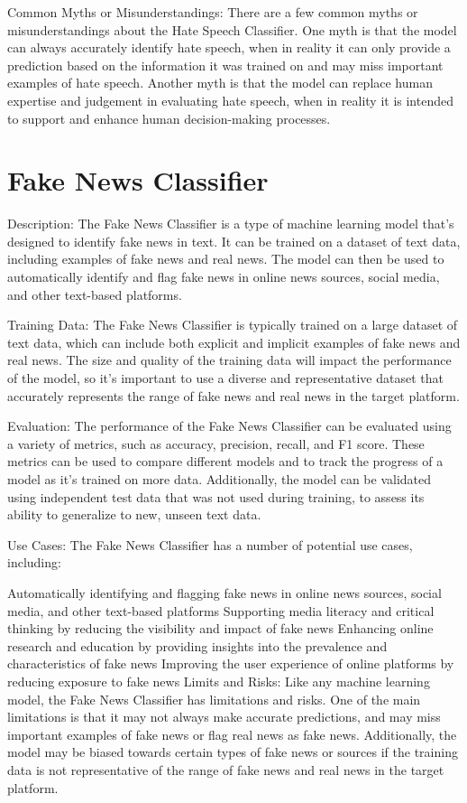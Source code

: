 Common Myths or Misunderstandings:
There are a few common myths or misunderstandings about the Hate Speech Classifier. One myth is that the model can always accurately identify hate speech, when in reality it can only provide a prediction based on the information it was trained on and may miss important examples of hate speech. Another myth is that the model can replace human expertise and judgement in evaluating hate speech, when in reality it is intended to support and enhance human decision-making processes.

\section{Fake News Classifier}

Description:
The Fake News Classifier is a type of machine learning model that's designed to identify fake news in text. It can be trained on a dataset of text data, including examples of fake news and real news. The model can then be used to automatically identify and flag fake news in online news sources, social media, and other text-based platforms.

Training Data:
The Fake News Classifier is typically trained on a large dataset of text data, which can include both explicit and implicit examples of fake news and real news. The size and quality of the training data will impact the performance of the model, so it's important to use a diverse and representative dataset that accurately represents the range of fake news and real news in the target platform.

Evaluation:
The performance of the Fake News Classifier can be evaluated using a variety of metrics, such as accuracy, precision, recall, and F1 score. These metrics can be used to compare different models and to track the progress of a model as it's trained on more data. Additionally, the model can be validated using independent test data that was not used during training, to assess its ability to generalize to new, unseen text data.

Use Cases:
The Fake News Classifier has a number of potential use cases, including:

Automatically identifying and flagging fake news in online news sources, social media, and other text-based platforms
Supporting media literacy and critical thinking by reducing the visibility and impact of fake news
Enhancing online research and education by providing insights into the prevalence and characteristics of fake news
Improving the user experience of online platforms by reducing exposure to fake news
Limits and Risks:
Like any machine learning model, the Fake News Classifier has limitations and risks. One of the main limitations is that it may not always make accurate predictions, and may miss important examples of fake news or flag real news as fake news. Additionally, the model may be biased towards certain types of fake news or sources if the training data is not representative of the range of fake news and real news in the target platform.

